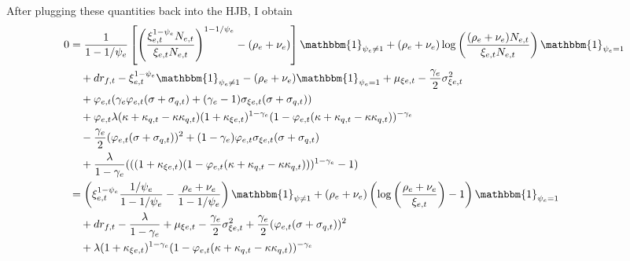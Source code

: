 \documentclass[12 pt, oneside]{article}
\theoremstyle{definition}
\theoremstyle{definition}
\theoremstyle{definition}
\begin{document}
After plugging these quantities back into the HJB, I obtain
\begin{align*}
  0 & = \frac{1}{1 - 1/\psi_e}\left[\left(\frac{\xi_{e, t}^{1 - \psi_e}N_{e, t}}{\xi_{e, t}N_{e, t}}\right)^{1 - 1/\psi_e} - (\rho_e + \nu_e)\right]\mathbbm{1}_{\psi_e\neq 1} + (\rho_e + \nu_e)\log\left(\frac{(\rho_e + \nu_e)N_{e, t}}{\xi_{e, t}N_{e, t}}\right)\mathbbm{1}_{\psi_e = 1}\\
    & \quad +  dr_{f, t} - \xi_{e, t}^{1 - \psi_e}\mathbbm{1}_{\psi_e \neq 1} - (\rho_e + \nu_e)\mathbbm{1}_{\psi_e = 1} + \mu_{\xi e, t} - \frac{\gamma_e}{2}\sigma_{\xi e, t}^2\\
    &\quad + \varphi_{e, t}(\gamma_e\varphi_{e, t}(\sigma + \sigma_{q, t}) + (\gamma_e - 1)\sigma_{\xi e, t}(\sigma + \sigma_{q, t})) \\
    &\quad + \varphi_{e, t}\lambda(\kappa + \kappa_{q, t} - \kappa\kappa_{q, t})(1 + \kappa_{\xi e, t})^{1 - \gamma_e}(1 - \varphi_{e, t}(\kappa + \kappa_{q, t} - \kappa\kappa_{q, t}))^{ - \gamma_e}\\
    &\quad - \frac{\gamma_e}{2}(\varphi_{e, t} (\sigma + \sigma_{q, t}))^2 + ( 1- \gamma_e)\varphi_{e, t}\sigma_{\xi e, t}(\sigma + \sigma_{q, t})\\
    &\quad + \frac{\lambda}{1 - \gamma_e}(((1 + \kappa_{\xi e, t})(1 - \varphi_{e, t}(\kappa + \kappa_{q, t} - \kappa\kappa_{q, t})))^{1 - \gamma_e} - 1)\\%
    & = \left(\xi_{e, t}^{1 - \psi_e}\frac{1 / \psi_e}{1 - 1/\psi_e}  - \frac{\rho_e + \nu_e}{1 - 1 / \psi_e} \right)\mathbbm{1}_{\psi\neq 1} + (\rho_e + \nu_e)\left(\log\left(\frac{\rho_e + \nu_e}{\xi_{e, t}}\right) - 1\right)\mathbbm{1}_{\psi_e = 1}\\
    &\quad + dr_{f, t} - \frac{\lambda}{1 - \gamma_e} + \mu_{\xi e, t} - \frac{\gamma_e}{2}\sigma_{\xi e, t}^2 +\frac{\gamma_e}{2}(\varphi_{e, t}(\sigma + \sigma_{q, t}))^2 \\
    &\quad + \lambda(1 + \kappa_{\xi e, t})^{1 - \gamma_e}(1 - \varphi_{e, t}(\kappa + \kappa_{q, t} - \kappa \kappa_{q, t}))^{ - \gamma_e}\\

\end{align*}
\end{document}
